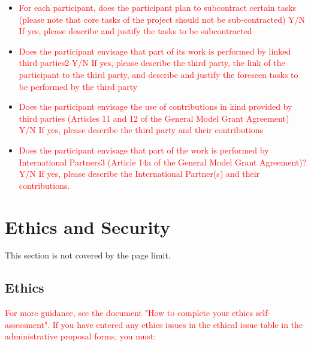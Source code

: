 \documentclass[11pt, a4paper]{article} %
\begin{document}
\begin{itemize}
\item \textcolor{red}{For each participant, does the participant plan
    to subcontract certain tasks (please note that core tasks of the
    project should not be sub-contracted) Y/N If yes, please describe
    and justify the tasks to be subcontracted}
\item \textcolor{red}{Does the participant envisage that part of its
    work is performed by linked third parties2 Y/N If yes, please
    describe the third party, the link of the participant to the third
    party, and describe and justify the foreseen tasks to be performed
    by the third party}
\item \textcolor{red}{Does the participant envisage the use of
    contributions in kind provided by third parties (Articles 11 and
    12 of the General Model Grant Agreement) Y/N If yes, please
    describe the third party and their contributions}
\item \textcolor{red}{Does the participant envisage that part of the
    work is performed by International Partners3 (Article 14a of the
    General Model Grant Agreement)?  Y/N If yes, please describe the
    International Partner(s) and their contributions.}
\end{itemize}


\section{Ethics and Security}

 This section is not covered by the page limit.

\subsection{Ethics}


\textcolor{red}{ For more guidance, see the document "How to complete
  your ethics self-assessment".  If you have entered any ethics issues
  in the ethical issue table in the administrative proposal forms, you
  must:}
\end{document}
